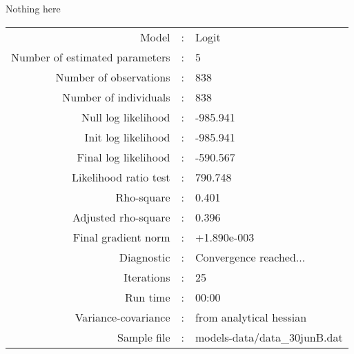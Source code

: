 Nothing here\\


\begin{flushleft}
\begin{tabular}{rcl}
\hline
Model &:& Logit\\
Number of estimated parameters&:&5\\
Number of  observations &:& 838\\
Number of individuals&:&838\\
Null log likelihood&:&-985.941\\
Init log likelihood&:&-985.941\\
Final log likelihood&:&-590.567\\
Likelihood ratio test &:&790.748\\
Rho-square&:&0.401\\
Adjusted rho-square&:&0.396\\
Final gradient norm&:&+1.890e-003\\
Diagnostic&:&Convergence reached...\\
Iterations&:&25\\
Run time&:&00:00\\
Variance-covariance&:&from analytical hessian
\\
Sample file&:&models-data/data_30junB.dat\\
\end{tabular}
\end{flushleft}
